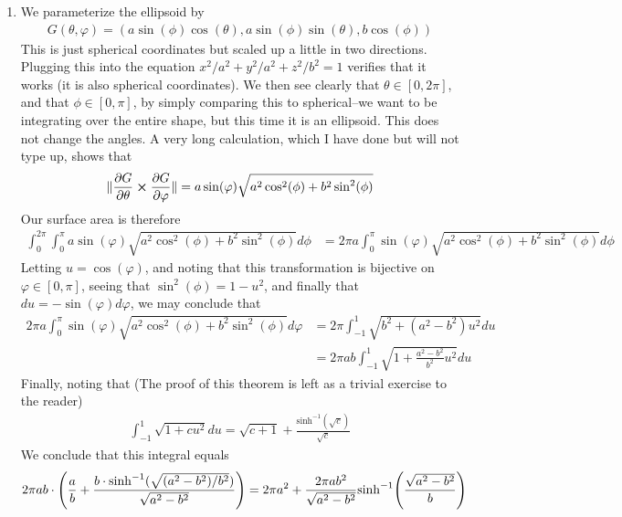 \documentclass[12pt]{article}
\theoremstyle{definition}
\theoremstyle{remark}
\newcommand{\vp}{\varphi}
\begin{document}
\begin{enumerate}[leftmargin=\labelsep]
		
		\item We parameterize the ellipsoid by 
		\begin{align*}
			G(\theta, \vp) = (a\sin(\phi)\cos(\theta), a\sin(\phi)\sin(\theta), b\cos(\phi))
		\end{align*}
		This is just spherical coordinates but scaled up a little in two directions. Plugging this into the equation $x^2/a^2+y^2/a^2+z^2/b^2=1$ verifies that it works (it is also spherical coordinates). We then see clearly that $\theta \in [0, 2\pi]$, and that $\phi \in [0, \pi]$, by simply comparing this to spherical--we want to be integrating over the entire shape, but this time it is an ellipsoid. This does not change the angles. A very long calculation, which I have done but will not type up, shows that
		\begin{align*}
			\| \pdv{G}{\theta}  \cross \pdv{G}{\vp} \| = a\sin(\vp)\sqrt{a^2\cos^2(\phi)+b^2\sin^2(\phi)}
		\end{align*}
		Our surface area is therefore
		\begin{align*}
			\int_0^{2\pi} \int_0^{\pi} a\sin(\vp)\sqrt{a^2\cos^2(\phi)+b^2\sin^2(\phi)}d\phi &= 2\pi a \int_0^{\pi} \sin(\vp)\sqrt{a^2\cos^2(\phi)+b^2\sin^2(\phi)}d\phi 
		\end{align*}
		Letting $u = \cos(\vp)$, and noting that this transformation is bijective on $\vp \in [0, \pi]$, seeing that $\sin^2(\phi) = 1 - u^2$, and finally that $du = -\sin(\vp)d\vp$, we may conclude that
		\begin{align*}
			2\pi a \int_0^{\pi} \sin(\vp)\sqrt{a^2\cos^2(\phi)+b^2\sin^2(\phi)}d\vp  &= 2\pi \int_{-1}^1 \sqrt{b^2 + (a^2-b^2)u^2}du \\
			&= 2\pi ab \int_{-1}^1 \sqrt{1+\frac{a^2-b^2}{b^2}u^2}du
		\end{align*}
		Finally, noting  that (The proof of this theorem is left as a trivial exercise to the reader)
		\begin{align*}
			\int_{-1}^{1} \sqrt{1+cu^2}du = \sqrt{c+1}+\frac{\mathrm{sinh}^{-1}(\sqrt{c})}{\sqrt{c}}
		\end{align*}
		We conclude that this integral equals
		\begin{align*}
			2\pi ab \cdot \qty(\frac ab + \frac{b\cdot \mathrm{sinh}^{-1}(\sqrt{(a^2-b^2)/b^2})}{\sqrt{a^2-b^2}})
			&= 2\pi a^2 + \frac{2\pi a b^2}{\sqrt{a^2-b^2}} \mathrm{sinh}^{-1}\qty(\frac{\sqrt{a^2-b^2}}{b})
		\end{align*}
		

\end{enumerate}
\end{document}
